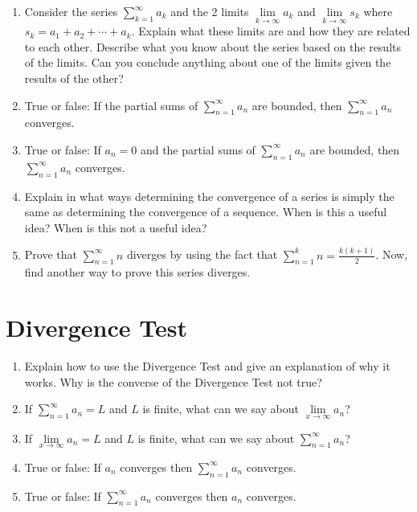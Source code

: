 \begin{enumerate}
\item Consider the series $\displaystyle\sum\limits_{k = 1}^\infty  {a_k } $ and the 2 limits $\mathop {\lim }\limits_{k \to \infty } a_k $ and $\mathop {\lim }\limits_{k \to \infty } s_k $ where $s_k  = a_1  + a_2  +  \cdots  + a_k $.  Explain what these limits are and how they are related to each other.  Describe what you know about the series based on the results of the limits.  Can you conclude anything about one of the limits given the results of the other?

\item True or false: If the partial sums of $
\displaystyle\sum _{n = 1}^\infty  {a_n } $ are bounded, then $\displaystyle\sum _{n = 1}^\infty  {a_n } $ converges.

\item True or false: If $a_n = 0$ and the partial sums of $
\displaystyle\sum _{n = 1}^\infty  {a_n } $ are bounded, then $\displaystyle\sum _{n = 1}^\infty  {a_n } $ converges.

\item Explain in what ways determining the convergence of a series is simply the same as determining the convergence of a sequence.  When is this a useful idea?  When is this not a useful idea?

\item Prove that $
\displaystyle\sum\limits_{n = 1}^\infty  n $ diverges by using the fact that $\displaystyle\sum\limits_{n = 1}^k n  = \frac{{k\left( {k + 1} \right)}}{2}$.  Now, find another way to prove this series diverges.

\end{enumerate}
\section{Divergence Test}
\begin{enumerate}

\item Explain how to use the Divergence Test and give an explanation of why it works.  Why is the converse of the Divergence Test not true?

\item If $
\displaystyle\sum _{n = 1}^\infty  {a_n }  = L$ and $L$ is finite, what can we say about $
\mathop {\lim }\limits_{x \to \infty } a_n $?

\item If $\mathop {\lim }\limits_{x \to \infty } a_n  = L$
 and $L$ is finite, what can we say about $\displaystyle\sum _{n = 1}^\infty  {a_n } $?

\item True or false:  If $a_n $ converges then $\displaystyle\sum _{n = 1}^\infty  {a_n } $ converges.

\item True or false:  If $\displaystyle\sum _{n = 1}^\infty  {a_n } $ converges then $a_n $ converges.

\end{enumerate}
